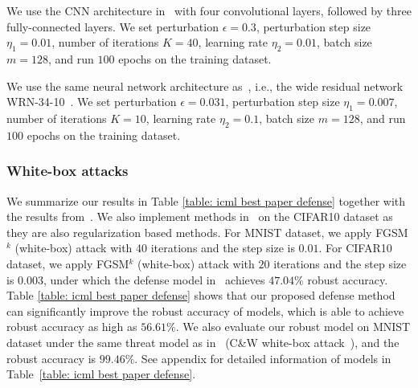 \documentclass[11pt]{article}
\newcommand{\0}{\mathbf{0}}
\newcommand{\1}{\mathbf{1}}
\begin{document}
\medskip
{} We use the CNN architecture in~\cite{carlini2017towards} with four convolutional layers, followed by three fully-connected layers. We set perturbation $\epsilon = 0.3$, perturbation step size $\eta_1 = 0.01$, number of iterations $K = 40$, learning rate $\eta_2 = 0.01$, batch size $m = 128$, and run $100$ epochs on the training dataset. 

\medskip
{} We use the same neural network architecture as~\cite{madry2018towards}, i.e., the wide residual network WRN-34-10~\cite{zagoruyko2016wide}. We set perturbation $\epsilon = 0.031$, perturbation step size $\eta_1 = 0.007$, number of iterations $K = 10$, learning rate $\eta_2 = 0.1$, batch size $m = 128$, and run $100$ epochs on the training dataset. 

\vspace{-0.2cm}
\subsubsection{White-box attacks}\label{subsec:white-box}
\vspace{-0.2cm}
We summarize our results in Table \ref{table: icml best paper defense} together with the results from~\cite{athalye2018obfuscated}. We also implement methods in~\cite{zheng2016improving,kurakin2016adversarial,ross2017improving} on the CIFAR10 dataset as they are also regularization based methods. For MNIST dataset, we apply FGSM$^k$ (white-box) attack with $40$ iterations and the step size is $0.01$. For CIFAR10 dataset, we apply FGSM$^k$ (white-box) attack with $20$ iterations and the step size is $0.003$, under which the defense model in~\cite{madry2018towards} achieves $47.04\%$ robust accuracy. Table \ref{table: icml best paper defense} shows that our proposed defense method can significantly improve the robust accuracy of models, which is able to achieve robust accuracy as high as $56.61\%$. We also evaluate our robust model on MNIST dataset under the same threat model as in~\cite{samangouei2018defense} (C\&W white-box attack~\cite{carlini2017towards}), and the robust accuracy is $99.46\%$. See appendix for detailed information of models in Table~\ref{table: icml best paper defense}.
\end{document}
